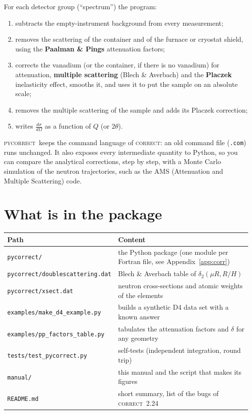 \documentclass[11pt,a4paper]{report}
\newcommand{\file}[1]{\texttt{#1}}
\newcommand{\pyc}{\textsc{pycorrect}}
\newcommand{\cor}{\textsc{correct}}
\newcommand{\dsig}{\frac{d\sigma}{d\Omega}}
\begin{document}
For each detector group (``spectrum'') the program:
\begin{enumerate}
  \item subtracts the empty-instrument background from every measurement;
  \item removes the scattering of the container and of the furnace or cryostat
        shield, using the \textbf{Paalman \& Pings} attenuation factors;
  \item corrects the vanadium (or the container, if there is no vanadium) for
        attenuation, \textbf{multiple scattering} (Blech \& Averbach) and
        the \textbf{Placzek} inelasticity effect, smooths it, and uses it to put
        the sample on an absolute scale;
  \item removes the multiple scattering of the sample and adds its Placzek
        correction;
  \item writes $\dsig$ as a function of $Q$ (or $2\theta$).
\end{enumerate}

\pyc\ keeps the command language of \cor: an old command file (\file{.com})
runs unchanged. It also exposes every intermediate quantity to Python, so you can
compare the analytical corrections, step by step, with a Monte Carlo simulation
of the neutron trajectories, such as the AMS (Attenuation and Multiple
Scattering) code.

\section{What is in the package}

\begin{center}
\begin{tabularx}{\linewidth}{@{}lX@{}}
\toprule
Path & Content \\
\midrule
\file{pycorrect/} & the Python package (one module per Fortran file, see Appendix~\ref{app:corr}) \\
\file{pycorrect/doublescattering.dat} & Blech \& Averbach table of $\delta_2(\mu R, R/H)$ \\
\file{pycorrect/xsect.dat} & neutron cross-sections and atomic weights of the elements \\
\file{examples/make\_d4\_example.py} & builds a synthetic D4 data set with a known answer \\
\file{examples/pp\_factors\_table.py} & tabulates the attenuation factors and $\delta$ for any geometry \\
\file{tests/test\_pycorrect.py} & self-tests (independent integration, round trip) \\
\file{manual/} & this manual and the script that makes its figures \\
\file{README.md} & short summary, list of the bugs of \cor\ 2.24 \\
\bottomrule
\end{tabularx}
\end{center}
\end{document}
